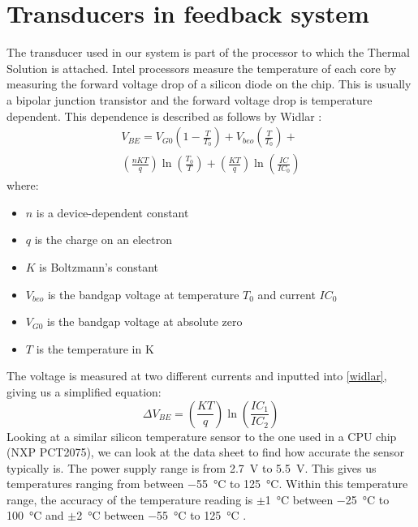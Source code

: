 \documentclass[conference]{IEEEtran}
\begin{document}
\section{Transducers in feedback system}
The transducer used in our system is part of the processor to which the Thermal Solution is attached. Intel processors measure the temperature of each core by measuring the forward voltage drop of a silicon diode on the chip. This is usually a bipolar junction transistor and the forward voltage drop is temperature dependent. This dependence is described as follows by Widlar \cite{b2} \cite{b7}:
\begin{multline}
    V_{BE} = V_{G0} \left(1-\frac{T}{T_0}\right) + V_{beo}\left(\frac{T}{T_0}\right) + \\\left(\frac{nKT}{q}\right)\ln\left(\frac{T_0}{T}\right) + \left(\frac{KT}{q}\right)\ln\left(\frac{IC}{IC_0}\right) \label{widlar}
\end{multline}
where:
\begin{itemize}
    \item $n$ is a device-dependent constant
    \item $q$ is the charge on an electron
    \item $K$ is Boltzmann's constant
    \item $V_{beo}$ is the bandgap voltage at temperature $T_0$ and current $IC_0$
    \item $V_{G0}$ is the bandgap voltage at absolute zero
    \item $T$ is the temperature in \si{\kelvin}
\end{itemize}
The voltage is measured at two different currents and inputted into \eqref{widlar}, giving us a simplified equation:
\begin{equation}
    \Delta V_{BE} = \left(\frac{KT}{q}\right)\ln\left(\frac{IC_1}{IC_2}\right)
    \label{bandgap}
\end{equation}
Looking at a similar silicon temperature sensor to the one used in a CPU chip (NXP PCT2075), we can look at the data sheet to find how accurate the sensor typically is. The power supply range is from \SI{2.7}{\volt} to \SI{5.5}{\volt}. This gives us temperatures ranging from between \SI{-55}{\celsius} to \SI{+125}{\celsius}. Within this temperature range, the accuracy of the temperature reading is $\pm$\SI{1}{\celsius} between \SI{-25}{\celsius} to \SI{+100}{\celsius} and $\pm$\SI{2}{\celsius} between \SI{-55}{\celsius} to \SI{+125}{\celsius} \cite{b3}. 
\end{document}
